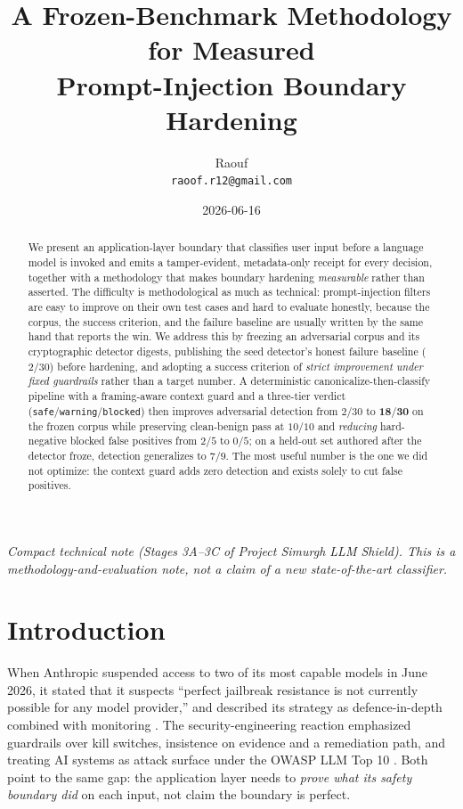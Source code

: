 \documentclass[11pt]{article}
\title{\textbf{A Frozen-Benchmark Methodology for Measured\\ Prompt-Injection Boundary Hardening}}
\author{Raouf\\ \texttt{raoof.r12@gmail.com}}
\date{2026-06-16}
\newcommand{\safe}{\texttt{safe}}
\newcommand{\warning}{\texttt{warning}}
\newcommand{\blocked}{\texttt{blocked}}
\begin{document}
\maketitle

\begin{abstract}
\noindent
We present an application-layer boundary that classifies user input before a language
model is invoked and emits a tamper-evident, metadata-only receipt for every decision,
together with a methodology that makes boundary hardening \emph{measurable} rather than
asserted. The difficulty is methodological as much as technical: prompt-injection filters
are easy to improve on their own test cases and hard to evaluate honestly, because the
corpus, the success criterion, and the failure baseline are usually written by the same
hand that reports the win. We address this by freezing an adversarial corpus and its
cryptographic detector digests, publishing the seed detector's honest failure baseline
($2/30$) before hardening, and adopting a success criterion of \emph{strict improvement
under fixed guardrails} rather than a target number. A deterministic
canonicalize-then-classify pipeline with a framing-aware context guard and a three-tier
verdict (\safe/\warning/\blocked) then improves adversarial detection from $2/30$ to
$\mathbf{18/30}$ on the frozen corpus while preserving clean-benign pass at $10/10$ and
\emph{reducing} hard-negative blocked false positives from $2/5$ to $0/5$; on a held-out
set authored after the detector froze, detection generalizes to $7/9$. The most useful
number is the one we did not optimize: the context guard adds zero detection and exists
solely to cut false positives.
\end{abstract}

\noindent\textit{Compact technical note (Stages 3A--3C of Project Simurgh LLM Shield).
This is a methodology-and-evaluation note, not a claim of a new state-of-the-art
classifier.}

\section{Introduction}
When Anthropic suspended access to two of its most capable models in June 2026, it stated
that it suspects ``perfect jailbreak resistance is not currently possible for any model
provider,'' and described its strategy as defence-in-depth combined with monitoring
\cite{anthropic2026}. The security-engineering reaction emphasized guardrails over kill
switches, insistence on evidence and a remediation path, and treating AI systems as
attack surface under the OWASP LLM Top 10 \cite{snyk2026,owasp2025}. Both point to the
same gap: the application layer needs to \emph{prove what its safety boundary did} on each
input, not claim the boundary is perfect.
\end{document}
